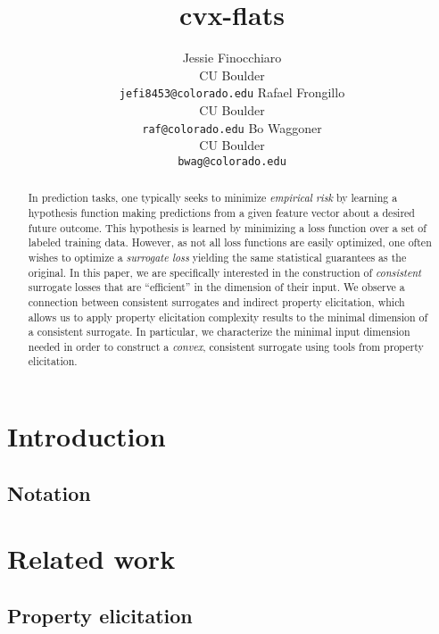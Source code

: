 \documentclass{article}
\title{cvx-flats}
\author{%
  Jessie Finocchiaro\\
  CU Boulder\\
  \texttt{jefi8453@colorado.edu} 
  \And
   Rafael Frongillo\\
   CU Boulder\\
   \texttt{raf@colorado.edu} 
   \And
   Bo Waggoner\\
   CU Boulder \\
   \texttt{bwag@colorado.edu} 
}
\begin{document}
\maketitle

\begin{abstract}
	In prediction tasks, one typically seeks to minimize \emph{empirical risk} by learning a hypothesis function making predictions from a given feature vector about a desired future outcome.
	This hypothesis is learned by minimizing a loss function over a set of labeled training data.
	However, as not all loss functions are easily optimized, one often wishes to optimize a \emph{surrogate loss} yielding the same statistical guarantees as the original.
	In this paper, we are specifically interested in the construction of \emph{consistent} surrogate losses that are ``efficient'' in the dimension of their input.
	We observe a connection between consistent surrogates and indirect property elicitation, which allows us to apply property elicitation complexity results to the minimal dimension of a consistent surrogate.
	In particular, we characterize the minimal input dimension needed in order to construct a \emph{convex}, consistent surrogate using tools from property elicitation.
\end{abstract}

\section{Introduction}\label{sec:intro}


\subsection{Notation}

\section{Related work}\label{sec:related-work}

\subsection{Property elicitation}\label{subsec:properties}
\end{document}

